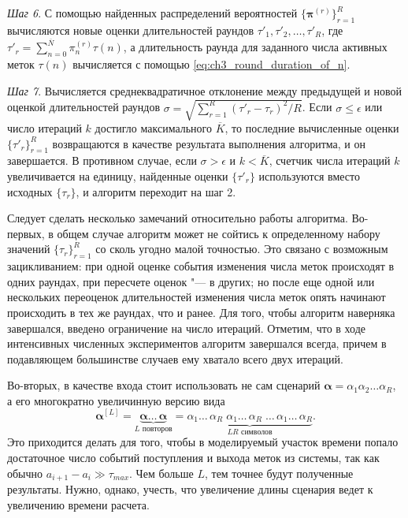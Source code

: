 \textit{Шаг 6}. С помощью найденных распределений вероятностей $\{ \bm{\pi}^{(r)} \}_{r=1}^R$ вычисляются новые оценки длительностей раундов $\tau'_1, \tau'_2, \dots, \tau'_R$, где $\tau'_r = \sum_{n=0}^{\overline{N}} \pi^{(r)}_n \tau(n)$, а длительность раунда для заданного числа активных меток $\tau(n)$ вычисляется с помощью \eqref{eq:ch3_round_duration_of_n}.

\textit{Шаг 7}. Вычисляется среднеквадратичное отклонение между предыдущей и новой оценкой длительностей раундов $\sigma = \sqrt{\sum_{r=1}^R (\tau'_r - \tau_r)^2 / R}$. Если $\sigma \leqslant \epsilon$ или число итераций $k$ достигло максимального $\overline{K}$, то последние вычисленные оценки $\{ \tau'_r \}_{r=1}^R$ возвращаются в качестве результата выполнения алгоритма, и он завершается. В противном случае, если $\sigma > \epsilon$ и $k < \overline{K}$, счетчик числа итераций $k$ увеличивается на единицу, найденные оценки $\{ \tau'_r \}$ используются вместо исходных $\{ \tau_r \}$, и алгоритм переходит на шаг 2.

Следует сделать несколько замечаний относительно работы алгоритма. Во-первых, в общем случае алгоритм может не сойтись к определенному набору значений $\{ \tau_r \}_{r=1}^R$ со сколь угодно малой точностью. Это связано с возможным зацикливанием: при одной оценке события изменения числа меток происходят в одних раундах, при пересчете оценок "--- в других; но после еще одной или нескольких переоценок длительностей изменения числа меток опять начинают происходить в тех же раундах, что и ранее. Для того, чтобы алгоритм наверняка завершался, введено ограничение на число итераций. Отметим, что в ходе интенсивных численных экспериментов алгоритм завершался всегда, причем в подавляющем большинстве случаев ему хватало всего двух итераций.

Во-вторых, в качестве входа стоит использовать не сам сценарий $\bm{\alpha} = \alpha_1 \alpha_2 \dots \alpha_R$, а его многократно увеличинную версию вида
$$
	\bm{\alpha}^{[L]} = \underbrace{\bm{\alpha} \dots\, \bm{\alpha}}_{L \text{ повторов}} =
		\underbrace{\alpha_1 \dots\, \alpha_R \; \alpha_1 \dots\, \alpha_R\; \dots \, \alpha_1 \dots\, \alpha_R}_{LR \text{ символов}}.
$$
Это приходится делать для того, чтобы в моделируемый участок времени попало достаточное число событий поступления и выхода меток из системы, так как обычно $a_{i+1} - a_i \gg \tau_{max}$. Чем больше $L$, тем точнее будут полученные результаты. Нужно, однако, учесть, что увеличение длины сценария ведет к увеличению времени расчета.


